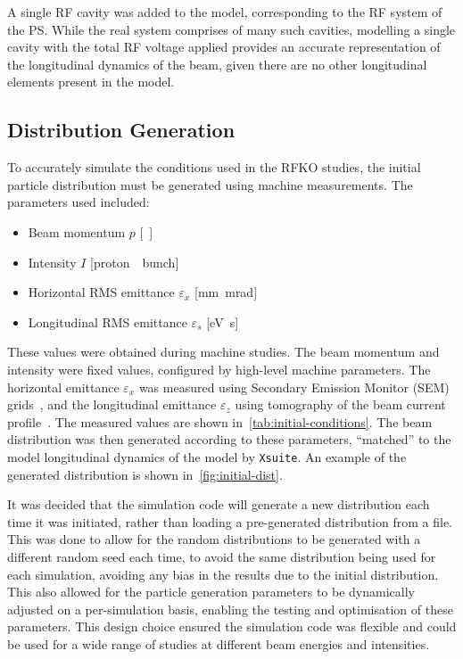 \documentclass[11pt]{report}
\begin{document}
A single RF cavity was added to the model, corresponding to the RF system of the PS. While the real system comprises of many such cavities, modelling a single cavity with the total RF voltage applied provides an accurate representation of the longitudinal dynamics of the beam, given there are no other longitudinal elements present in the model.

\subsection{Distribution Generation}

To accurately simulate the conditions used in the RFKO studies, the initial particle distribution must be generated using machine measurements. The parameters used included:
\begin{itemize}
  \item Beam momentum $p$ [\si{\giga\eVperc}]
  \item Intensity $I$ [\si{proton \per bunch}]
  \item Horizontal RMS emittance $\varepsilon_x$ [\si{\milli\meter\milli\radian}]
  \item Longitudinal RMS emittance $\varepsilon_s$ [\si{\electronvolt\second}]
\end{itemize}  

These values were obtained during machine studies. The beam momentum and intensity were fixed values, configured by high-level machine parameters. The horizontal emittance $\varepsilon_x$ was measured using Secondary Emission Monitor (SEM) grids~\cite{Martini:324553}, and the longitudinal emittance $\varepsilon_z$ using tomography of the beam current profile~\cite{Hancock:960231}. The measured values are shown in~\autoref{tab:initial-conditions}. The beam distribution was then generated according to these parameters, ``matched'' to the model longitudinal dynamics of the model by \verb|Xsuite|. An example of the generated distribution is shown in~\autoref{fig:initial-dist}.

It was decided that the simulation code will generate a new distribution each time it was initiated, rather than loading a pre-generated distribution from a file. This was done to allow for the random distributions to be generated with a different random seed each time, to avoid the same distribution being used for each simulation, avoiding any bias in the results due to the initial distribution. This also allowed for the particle generation parameters to be dynamically adjusted on a per-simulation basis, enabling the testing and optimisation of these parameters. This design choice ensured the simulation code was flexible and could be used for a wide range of studies at different beam energies and intensities.
\end{document}
